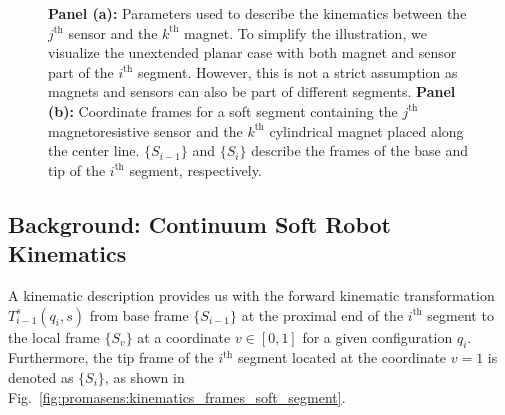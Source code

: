 \begin{figure}[t]
\centering
{}
\caption{\textbf{Panel (a):} Parameters used to describe the kinematics between the $j^\mathrm{th}$ sensor and the $k^\mathrm{th}$ magnet. To simplify the illustration, we visualize the unextended planar case with both magnet and sensor part of the $i^\mathrm{th}$ segment. However, this is not a strict assumption as magnets and sensors can also be part of different segments. \textbf{Panel (b):} Coordinate frames for a soft segment containing the $j^\mathrm{th}$ magnetoresistive sensor and the $k^\mathrm{th}$ cylindrical magnet placed along the center line. $\{S_{i-1}\}$ and $\{S_{i}\}$ describe the frames of the base and tip of the $i^\mathrm{th}$ segment, respectively.}
\end{figure}

\subsection{Background: Continuum Soft Robot Kinematics}\label{sub:promasens:kinematics}
A kinematic description provides us with the forward kinematic transformation $T_{i-1}^s(q_i,s)$ from base frame $\{S_{i-1}\}$ at the proximal end of the $i^\mathrm{th}$ segment to the local frame $\{S_{v}\}$ at a coordinate $v \in [0,1]$ for a given configuration $q_i$. Furthermore, the tip frame of the $i^\mathrm{th}$ segment located at the coordinate $v = 1$ is denoted as $\{S_{i}\}$, as shown in Fig.~\ref{fig:promasens:kinematics_frames_soft_segment}.

